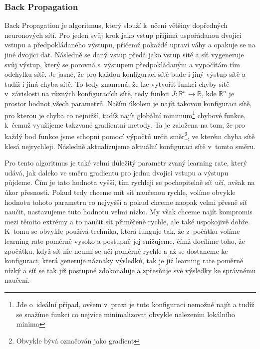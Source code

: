 \documentclass[a4paper]{article}
\begin{document}
\subsubsection{Back Propagation}
Back Propagation je algoritmus, který slouží k~učení většiny dopředných neuronových sítí. Pro jeden svůj krok jako vstup přijímá uspořádanou dvojici vstupu a předpokládaného výstupu, přičemž pokaždé upraví váhy a opakuje se na jiné dvojici dat. Následně se daný vstup předá jako vstup sítě a síť vygeneruje svůj výstup, který se porovná s~výstupem předpokládaným a vypočítám tím odchylku sítě. Je jasné, že pro každou konfiguraci sítě bude i jiný výstup sítě a tudíž i jiná chyba sítě. To tedy znamená, že lze vytvořit funkci chyby sítě v~závislosti na různých konfiguracích sítě, tedy funkci $J: \mathbb{R}^n \rightarrow \mathbb{R}$, kde $\mathbb{R}^n$ je prostor hodnot všech parametrů. Naším úkolem je najít takovou konfiguraci sítě, pro kterou je chyba co nejnižší, tudíž najít globální minimum\footnote{Jde o~ideální případ, ovšem v~praxi je tuto konfiguraci nemožné najít a tudíž se snažíme funkci co nejvíce minimalizovat obvykle nalezením lokálního minima} chybové funkce, k~čemuž využijeme takzvané gradientní metody. Ta je založena na tom, že pro každý bod funkce jsme schopni pomocí výpočtů určit směr\footnote{Obvykle bývá označován jako gradient}, ve kterém chyba sítě klesá nejrychleji. Následně aktualizujeme aktuální konfiguraci sítě v~tomto směru.\par
Pro tento algoritmus je také velmi důležitý parametr zvaný learning rate, který udává, jak daleko ve směru gradientu pro jednu dvojici vstupu a výstupu půjdeme. Čím je tato hodnota vyšší, tím rychleji se pochopitelně síť učí, avšak na úkor přesnosti. Pokud tedy chceme mít síť naučenou rychle, volíme obvykle hodnotu tohoto parametru co nejvyšší a pokud chceme naopak velmi přesně síť naučit, nastavujeme tuto hodnotu velmi nízko. My však chceme najít kompromis mezi těmito extrémy a to naučit síť přiměřeně rychle, ale také uspokojivě dobře. K~tomu se obvykle používá technika, která funguje tak, že z~počátku volíme learning rate poměrně vysoko a postupně jej snižujeme, čímž docílíme toho, že zpočátku, když síť nic neumí se učí poměrně rychle a až se dostaneme ke konfiguraci, která generuje náznaky výsledků, tak je již learning rate poměrně nízký a síť se tak již postupně zdokonaluje a zpřesňuje své výsledky ke správnému naučení.\par
\end{document}
